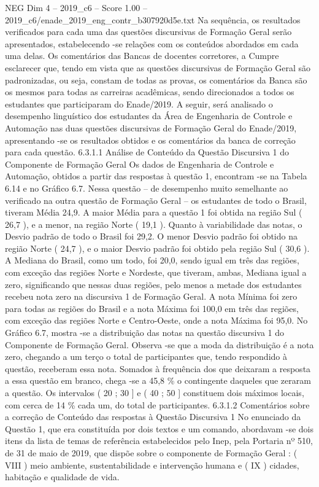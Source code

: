 \begin{textsample}{NEG Dim 4 – 2019\_c6 – Score 1.00 – 2019\_c6/enade\_2019\_eng\_contr\_b307920d5e.txt}
Na sequência, os resultados verificados para cada uma das questões discursivas de Formação Geral serão apresentados, estabelecendo -se relações com os conteúdos abordados em cada uma delas.
Os comentários das Bancas de docentes corretores, a Cumpre esclarecer que, tendo em vista que as questões discursivas de Formação Geral são padronizadas, ou seja, constam de todas as provas, os comentários da Banca são os mesmos para todas as carreiras acadêmicas, sendo direcionados a todos os estudantes que participaram do Enade/2019.
A seguir, será analisado o desempenho linguístico dos estudantes da Área de Engenharia de Controle e Automação nas duas questões discursivas de Formação Geral do Enade/2019, apresentando -se os resultados obtidos e os comentários da banca de correção para cada questão. 6.3.1.1 Análise de Conteúdo da Questão Discursiva 1 do Componente de Formação Geral Os dados de Engenharia de Controle e Automação, obtidos a partir das respostas à questão 1, encontram -se na Tabela 6.14 e no Gráfico 6.7.
Nessa questão – de desempenho muito semelhante ao verificado na outra questão de Formação Geral – os estudantes de todo o Brasil, tiveram Média 24,9.
A maior Média para a questão 1 foi obtida na região Sul ( 26,7 ), e a menor, na região Norte ( 19,1 ).
Quanto à variabilidade das notas, o Desvio padrão de todo o Brasil foi 29,2.
O menor Desvio padrão foi obtido na região Norte ( 24,7 ), e o maior Desvio padrão foi obtido pela região Sul ( 30,6 ).
A Mediana do Brasil, como um todo, foi 20,0, sendo igual em três das regiões, com exceção das regiões Norte e Nordeste, que tiveram, ambas, Mediana igual a zero, significando que nessas duas regiões, pelo menos a metade dos estudantes recebeu nota zero na discursiva 1 de Formação Geral.
A nota Mínima foi zero para todas as regiões do Brasil e a nota Máxima foi 100,0 em três das regiões, com exceção das regiões Norte e Centro-Oeste, onde a nota Máxima foi 95,0.
No Gráfico 6.7, mostra -se a distribuição das notas na questão discursiva 1 do Componente de Formação Geral.
Observa -se que a moda da distribuição é a nota zero, chegando a um terço o total de participantes que, tendo respondido à questão, receberam essa nota.
Somados à frequência dos que deixaram a resposta a essa questão em branco, chega -se a 45,8 \% o contingente daqueles que zeraram a questão.
Os intervalos ( 20 ; 30 ] e ( 40 ; 50 ] constituem dois máximos locais, com cerca de 14 \% cada um, do total de participantes. 6.3.1.2 Comentários sobre a correção de Conteúdo das respostas à Questão Discursiva 1 No enunciado da Questão 1, que era constituída por dois textos e um comando, abordavam -se dois itens da lista de temas de referência estabelecidos pelo Inep, pela Portaria nº 510, de 31 de maio de 2019, que dispõe sobre o componente de Formação Geral : ( VIII ) meio ambiente, sustentabilidade e intervenção humana e ( IX ) cidades, habitação e qualidade de vida.

\end{textsample}
